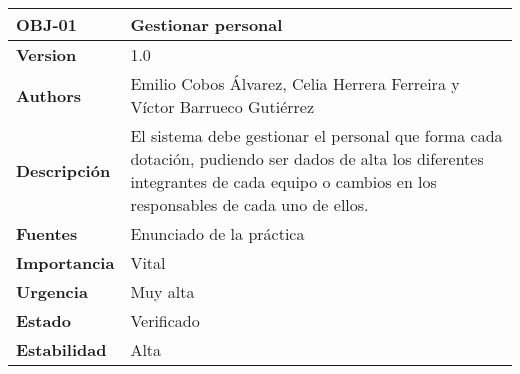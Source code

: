 \begin{tabular}{|l|X|}
    \textbf{OBJ-01} & Gestionar personal \\ \hline
    \textbf{Version} & 1.0 \\ \hline
    \textbf{Authors} & Emilio Cobos Álvarez, Celia Herrera Ferreira y Víctor Barrueco Gutiérrez \\ \hline
    \textbf{Descripción} & El sistema debe gestionar el personal que forma cada dotación, pudiendo ser dados de alta los diferentes integrantes de cada equipo o cambios en los responsables de cada uno de ellos. \\ \hline
    \textbf{Fuentes} & Enunciado de la práctica \\ \hline
    \textbf{Importancia} & Vital \\ \hline
    \textbf{Urgencia} & Muy alta \\ \hline
    \textbf{Estado} & Verificado \\ \hline
    \textbf{Estabilidad} & Alta \\ \hline
\end{tabular}
